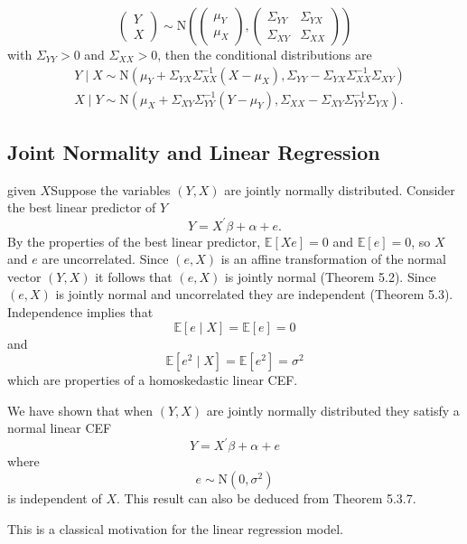 \documentclass[10pt]{article}
\begin{document}
$$
\left(\begin{array}{l}
Y \\
X
\end{array}\right) \sim \mathrm{N}\left(\left(\begin{array}{l}
\mu_{Y} \\
\mu_{X}
\end{array}\right),\left(\begin{array}{cc}
\Sigma_{Y Y} & \Sigma_{Y X} \\
\Sigma_{X Y} & \Sigma_{X X}
\end{array}\right)\right)
$$
with $\Sigma_{Y Y}>0$ and $\Sigma_{X X}>0$, then the conditional distributions are
$$
\begin{aligned}
&Y \mid X \sim \mathrm{N}\left(\mu_{Y}+\Sigma_{Y X} \Sigma_{X X}^{-1}\left(X-\mu_{X}\right), \Sigma_{Y Y}-\Sigma_{Y X} \Sigma_{X X}^{-1} \Sigma_{X Y}\right) \\
&X \mid Y \sim \mathrm{N}\left(\mu_{X}+\Sigma_{X Y} \Sigma_{Y Y}^{-1}\left(Y-\mu_{Y}\right), \Sigma_{X X}-\Sigma_{X Y} \Sigma_{Y Y}^{-1} \Sigma_{Y X}\right) .
\end{aligned}
$$

\subsection{Joint Normality and Linear Regression}
 given $X$Suppose the variables $(Y, X)$ are jointly normally distributed. Consider the best linear predictor of $Y$
$$
Y=X^{\prime} \beta+\alpha+e .
$$
By the properties of the best linear predictor, $\mathbb{E}[X e]=0$ and $\mathbb{E}[e]=0$, so $X$ and $e$ are uncorrelated. Since $(e, X)$ is an affine transformation of the normal vector $(Y, X)$ it follows that $(e, X)$ is jointly normal (Theorem 5.2). Since $(e, X)$ is jointly normal and uncorrelated they are independent (Theorem 5.3). Independence implies that
$$
\mathbb{E}[e \mid X]=\mathbb{E}[e]=0
$$
and
$$
\mathbb{E}\left[e^{2} \mid X\right]=\mathbb{E}\left[e^{2}\right]=\sigma^{2}
$$
which are properties of a homoskedastic linear CEF.

We have shown that when $(Y, X)$ are jointly normally distributed they satisfy a normal linear CEF
$$
Y=X^{\prime} \beta+\alpha+e
$$
where
$$
e \sim \mathrm{N}\left(0, \sigma^{2}\right)
$$
is independent of $X$. This result can also be deduced from Theorem 5.3.7.

This is a classical motivation for the linear regression model.
\end{document}
